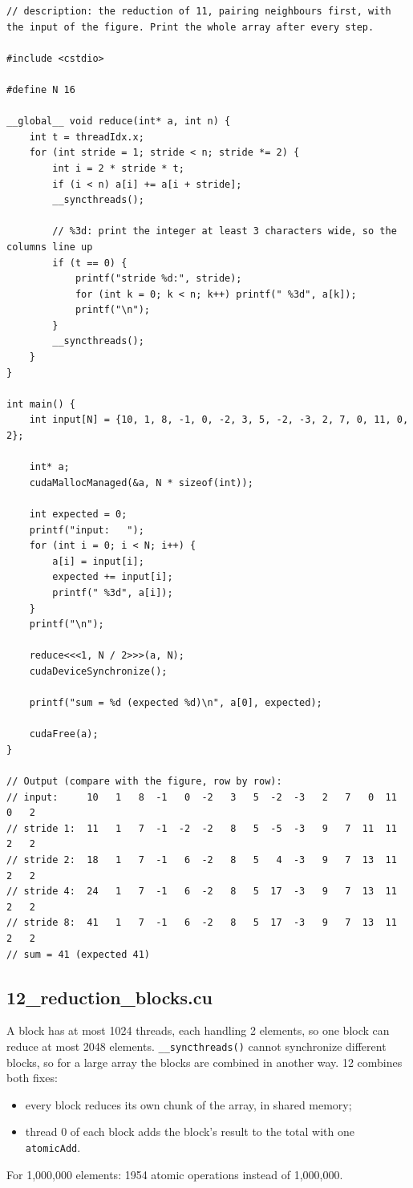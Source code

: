 \documentclass[main.tex]{subfiles}
\begin{document}
\begin{lstlisting}[language=CUDA]
// description: the reduction of 11, pairing neighbours first, with the input of the figure. Print the whole array after every step.

#include <cstdio>

#define N 16

__global__ void reduce(int* a, int n) {
    int t = threadIdx.x;
    for (int stride = 1; stride < n; stride *= 2) {
        int i = 2 * stride * t;
        if (i < n) a[i] += a[i + stride];
        __syncthreads();

        // %3d: print the integer at least 3 characters wide, so the columns line up
        if (t == 0) {
            printf("stride %d:", stride);
            for (int k = 0; k < n; k++) printf(" %3d", a[k]);
            printf("\n");
        }
        __syncthreads();
    }
}

int main() {
    int input[N] = {10, 1, 8, -1, 0, -2, 3, 5, -2, -3, 2, 7, 0, 11, 0, 2};

    int* a;
    cudaMallocManaged(&a, N * sizeof(int));

    int expected = 0;
    printf("input:   ");
    for (int i = 0; i < N; i++) {
        a[i] = input[i];
        expected += input[i];
        printf(" %3d", a[i]);
    }
    printf("\n");

    reduce<<<1, N / 2>>>(a, N);
    cudaDeviceSynchronize();

    printf("sum = %d (expected %d)\n", a[0], expected);

    cudaFree(a);
}

// Output (compare with the figure, row by row):
// input:     10   1   8  -1   0  -2   3   5  -2  -3   2   7   0  11   0   2
// stride 1:  11   1   7  -1  -2  -2   8   5  -5  -3   9   7  11  11   2   2
// stride 2:  18   1   7  -1   6  -2   8   5   4  -3   9   7  13  11   2   2
// stride 4:  24   1   7  -1   6  -2   8   5  17  -3   9   7  13  11   2   2
// stride 8:  41   1   7  -1   6  -2   8   5  17  -3   9   7  13  11   2   2
// sum = 41 (expected 41)
\end{lstlisting}

\subsection{12\_reduction\_blocks.cu}

A block has at most 1024 threads, each handling 2 elements, so one block can reduce at most 2048 elements.
\texttt{\_\_syncthreads()} cannot synchronize different blocks, so for a large array the blocks are combined in another way.
12 combines both fixes:
\begin{itemize}[nosep]
  \item every block reduces its own chunk of the array, in shared memory;
  \item thread 0 of each block adds the block's result to the total with one \texttt{atomicAdd}.
\end{itemize}
For 1,000,000 elements: 1954 atomic operations instead of 1,000,000.
\end{document}
